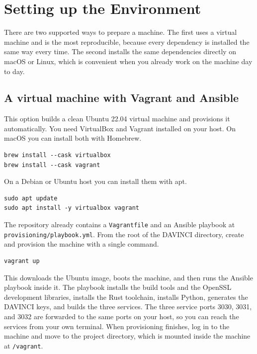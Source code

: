 \documentclass[11pt,a4paper]{article}
\begin{document}
\section{Setting up the Environment}

There are two supported ways to prepare a machine. The first uses a virtual
machine and is the most reproducible, because every dependency is installed the
same way every time. The second installs the same dependencies directly on macOS
or Linux, which is convenient when you already work on the machine day to day.

\subsection{A virtual machine with Vagrant and Ansible}

This option builds a clean Ubuntu 22.04 virtual machine and provisions it
automatically. You need VirtualBox and Vagrant installed on your host. On macOS
you can install both with Homebrew.

\begin{lstlisting}
brew install --cask virtualbox
brew install --cask vagrant
\end{lstlisting}

On a Debian or Ubuntu host you can install them with apt.

\begin{lstlisting}
sudo apt update
sudo apt install -y virtualbox vagrant
\end{lstlisting}

The repository already contains a \texttt{Vagrantfile} and an Ansible playbook at
\texttt{provisioning/}\allowbreak\texttt{playbook.yml}. From the root of the DAVINCI directory,
create and provision the machine with a single command.

\begin{lstlisting}
vagrant up
\end{lstlisting}

This downloads the Ubuntu image, boots the machine, and then runs the Ansible
playbook inside it. The playbook installs the build tools and the OpenSSL
development libraries, installs the Rust toolchain, installs Python, generates
the DAVINCI keys, and builds the three services. The three service ports 3030,
3031, and 3032 are forwarded to the same ports on your host, so you can reach the
services from your own terminal. When provisioning finishes, log in to the
machine and move to the project directory, which is mounted inside the machine at
\texttt{/vagrant}.
\end{document}
